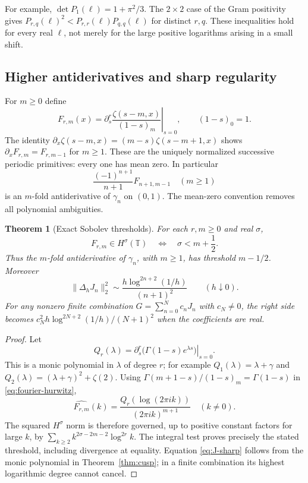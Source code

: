 \documentclass[11pt,a4paper]{article}
\numberwithin{equation}{section}
\newtheorem{theorem}{Theorem}[section]
\theoremstyle{definition}
\theoremstyle{remark}
\begin{document}
For example, $\det P_1(\ell)=1+\pi^2/3$. The $2\times2$ case of
the Gram positivity gives $P_{r,q}(\ell)^2<P_{r,r}(\ell)P_{q,q}(\ell)$
for distinct $r,q$. These inequalities hold for every real $\ell$,
not merely for the large positive logarithms arising in a small shift.

\subsection{Higher antiderivatives and sharp regularity}

For $m\geq0$ define
\begin{equation}\label{eq:higher-primitive}
 F_{r,m}(x)=\left.\partial_s^r
       \frac{\zeta(s-m,x)}{(1-s)_m}\right|_{s=0},
 \qquad (1-s)_0=1.
\end{equation}
The identity $\partial_x\zeta(s-m,x)=(m-s)\zeta(s-m+1,x)$
shows $\partial_xF_{r,m}=F_{r,m-1}$ for $m\geq1$.
These are the uniquely normalized successive periodic primitives: every
one has mean zero. In particular
\[
 \frac{(-1)^{n+1}}{n+1}F_{n+1,m-1}
 \quad(m\geq1)
\]
is an $m$-fold antiderivative of $\gamma_n$ on $(0,1)$.
The mean-zero convention removes all polynomial ambiguities.

\begin{theorem}[Exact Sobolev thresholds]\label{thm:sobolev}
For each $r,m\geq0$ and real $\sigma$,
\[
 F_{r,m}\in H^\sigma(\mathbb T)
 \quad\Longleftrightarrow\quad \sigma<m+\frac12.
\]
Thus the $m$-fold antiderivative of $\gamma_n$, with $m\geq1$, has
threshold $m-1/2$. Moreover
\begin{equation}\label{eq:J-sharp}
 \|\Delta_hJ_n\|_2^2
 \sim\frac{h\log^{2n+2}(1/h)}{(n+1)^2}\qquad(h\downarrow0).
\end{equation}
For any nonzero finite combination $G=\sum_{n=0}^Nc_nJ_n$ with
$c_N\ne0$, the right side becomes
$c_N^2h\log^{2N+2}(1/h)/(N+1)^2$ when the coefficients are real.
\end{theorem}

\begin{proof}
Let
\[
 Q_r(\lambda)=\left.\partial_s^r
                      \bigl(\Gamma(1-s)e^{\lambda s}\bigr)\right|_{s=0}.
\]
This is a monic polynomial in $\lambda$ of degree $r$; for example
$Q_1(\lambda)=\lambda+\gamma$ and
$Q_2(\lambda)=(\lambda+\gamma)^2+\zeta(2)$.
Using $\Gamma(m+1-s)/(1-s)_m=\Gamma(1-s)$ in
\eqref{eq:fourier-hurwitz},
\begin{equation}\label{eq:primitive-fourier}
 \widehat{F_{r,m}}(k)
       =\frac{Q_r(\log(2\pi ik))}{(2\pi ik)^{m+1}}
          \quad(k\ne0).
\end{equation}
The squared $H^\sigma$ norm is therefore governed, up to positive
constant factors for large $k$, by
$\sum_{k\geq2}k^{2\sigma-2m-2}\log^{2r}k$.
The integral test proves precisely the stated threshold, including
divergence at equality. Equation \eqref{eq:J-sharp} follows from the
monic polynomial in Theorem~\ref{thm:cusp}; in a finite combination its
highest logarithmic degree cannot cancel.
\end{proof}
\end{document}

